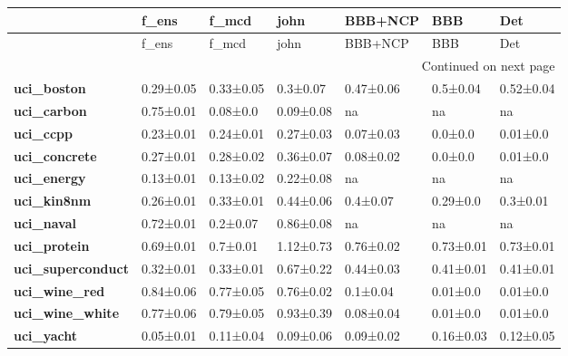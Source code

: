 \begin{longtable}[l]{lllllll}
\toprule
{} &      f\_ens &      f\_mcd &       john &    BBB+NCP &        BBB &        Det \\
\midrule
\endfirsthead

\toprule
{} &      f\_ens &      f\_mcd &       john &    BBB+NCP &        BBB &        Det \\
\midrule
\endhead
\midrule
\multicolumn{7}{r}{{Continued on next page}} \\
\midrule
\endfoot

\bottomrule
\endlastfoot
\textbf{uci\_boston      } &  0.29±0.05 &  0.33±0.05 &   0.3±0.07 &  0.47±0.06 &   0.5±0.04 &  0.52±0.04 \\
\textbf{uci\_carbon      } &  0.75±0.01 &   0.08±0.0 &  0.09±0.08 &         na &         na &         na \\
\textbf{uci\_ccpp        } &  0.23±0.01 &  0.24±0.01 &  0.27±0.03 &  0.07±0.03 &    0.0±0.0 &   0.01±0.0 \\
\textbf{uci\_concrete    } &  0.27±0.01 &  0.28±0.02 &  0.36±0.07 &  0.08±0.02 &    0.0±0.0 &   0.01±0.0 \\
\textbf{uci\_energy      } &  0.13±0.01 &  0.13±0.02 &  0.22±0.08 &         na &         na &         na \\
\textbf{uci\_kin8nm      } &  0.26±0.01 &  0.33±0.01 &  0.44±0.06 &   0.4±0.07 &   0.29±0.0 &   0.3±0.01 \\
\textbf{uci\_naval       } &  0.72±0.01 &   0.2±0.07 &  0.86±0.08 &         na &         na &         na \\
\textbf{uci\_protein     } &  0.69±0.01 &   0.7±0.01 &  1.12±0.73 &  0.76±0.02 &  0.73±0.01 &  0.73±0.01 \\
\textbf{uci\_superconduct} &  0.32±0.01 &  0.33±0.01 &  0.67±0.22 &  0.44±0.03 &  0.41±0.01 &  0.41±0.01 \\
\textbf{uci\_wine\_red    } &  0.84±0.06 &  0.77±0.05 &  0.76±0.02 &   0.1±0.04 &   0.01±0.0 &   0.01±0.0 \\
\textbf{uci\_wine\_white  } &  0.77±0.06 &  0.79±0.05 &  0.93±0.39 &  0.08±0.04 &   0.01±0.0 &   0.01±0.0 \\
\textbf{uci\_yacht       } &  0.05±0.01 &  0.11±0.04 &  0.09±0.06 &  0.09±0.02 &  0.16±0.03 &  0.12±0.05 \\
\end{longtable}
